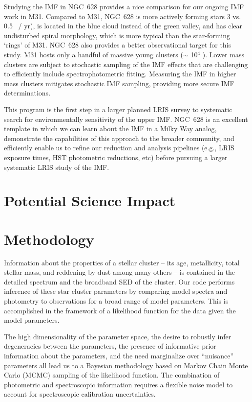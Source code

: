 \documentclass[11pt,preprint]{aastex}
\begin{document}
Studying the IMF in NGC~628 provides a nice comparison for our ongoing IMF work in M31.  Compared to M31, NGC~628 is more actively forming stars 3 vs. 0.5 \msun\ / yr), is located in the blue cloud instead of the green valley, and has clear undisturbed spiral morphology, which is more typical than the star-forming `rings' of M31.  NGC~628 also provides a better observational target for this study. M31 hosts only a handful of massive young clusters ($\sim$ 10$^4$ \msun).  Lower mass clusters are subject to stochastic sampling of the IMF effects that are challenging to efficiently include spectrophotometric fitting.  Measuring the IMF in higher mass clusters mitigates stochastic IMF sampling, providing more secure IMF determinations.

This program is the first step in a larger planned LRIS survey to systematic search for environmentally sensitivity of the upper IMF.  NGC~628 is an excellent template in which we can learn about the IMF in a Milky Way analog, demonstrate the capabilities of this approach to the broader community, and efficiently enable us to refine our reduction and analysis pipelines (e.g., LRIS exposure times, HST photometric reductions, etc) before pursuing a larger systematic LRIS study of the IMF.



\section{Potential Science Impact}



\section{Methodology}

Information about the properties of a stellar cluster -- its age, metallicity, total stellar mass, and reddening by dust among many others -- is contained in the detailed spectrum and the broadband SED of the cluster. 
Our code performs inference of these star cluster parameters by comparing model spectra and photometry to observations for a broad range of model parameters.  
This is accomplished in the framework of a likelihood function for the data given the model parameters.  

The high dimensionality of the parameter space, the desire to robustly infer degeneracies between the parameters, the presence of informative prior information about the parameters, and the need marginalize over ``nuisance'' parameters all lead us to a Bayesian methodology based on Markov Chain Monte Carlo (MCMC) sampling of the likelihood function. 
The combination of photometric and spectroscopic information requires a flexible noise model to account for spectroscopic calibration uncertainties.
\end{document}
